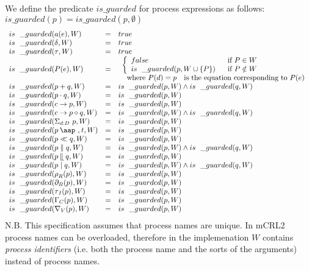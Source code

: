 \documentclass{article}
\providecommand{\at}{\mathbin{\mbox{\aap ,}}}
\providecommand{\leftmerge}{\mathbin{\mathrel{\llfloor}}}
\begin{document}
We define the predicate $is\_guarded$ for process expressions as follows: $%
is\_guarded(p)=is\_guarded(p,\emptyset )$%
\[
\begin{array}{lll}
is\_guarded(a(e),W) & = & true \\ 
is\_guarded(\delta ,W) & = & true \\ 
is\_guarded(\tau ,W) & = & true \\ 
is\_guarded(P(e),W) & = & 
\begin{array}{l}
\left\{ 
\begin{array}{ll}
false & \text{if }P\in W \\ 
is\_guarded(p,W\cup \{P\}) & \text{if }P\notin W%
\end{array}%
\right. \\ 
\text{where }P(d)=p\text{ is the equation corresponding to }P(e)%
\end{array}
\\ 
is\_guarded(p+q,W) & = & is\_guarded(p,W)\wedge is\_guarded(q,W) \\ 
is\_guarded(p\cdot q,W) & = & is\_guarded(p,W) \\ 
is\_guarded(c\rightarrow p,W) & = & is\_guarded(p,W) \\ 
is\_guarded(c\rightarrow p\diamond q,W) & = & is\_guarded(p,W)\wedge
is\_guarded(q,W) \\ 
is\_guarded(\Sigma _{d:D}\ p,W) & = & is\_guarded(p,W) \\ 
is\_guarded(p\at t,W) & = & is\_guarded(p,W) \\ 
is\_guarded(p\ll q,W) & = & is\_guarded(p,W) \\ 
is\_guarded(p\parallel q,W) & = & is\_guarded(p,W)\wedge is\_guarded(q,W) \\ 
is\_guarded(p\leftmerge q,W) & = & is\_guarded(p,W) \\ 
is\_guarded(p\mid q,W) & = & is\_guarded(p,W)\wedge is\_guarded(q,W) \\ 
is\_guarded(\rho _{R}(p),W) & = & is\_guarded(p,W) \\ 
is\_guarded(\partial _{B}(p),W) & = & is\_guarded(p,W) \\ 
is\_guarded(\tau _{I}(p),W) & = & is\_guarded(p,W) \\ 
is\_guarded(\Gamma _{C}(p),W) & = & is\_guarded(p,W) \\ 
is\_guarded(\nabla _{V}(p),W) & = & is\_guarded(p,W)%
\end{array}%
\]%
\newline
N.B. This specification assumes that process names are unique. In mCRL2
process names can be overloaded, therefore in the implemenation $W$ contains 
\emph{process identifiers} (i.e. both the process name and the sorts of the
arguments) instead of process names.
\end{document}
